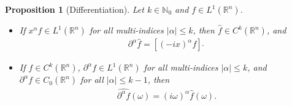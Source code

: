 \documentclass{article}
\numberwithin{equation}{section}
\newcommand{\bbR}{\mathbb{R}}
\newcommand{\wh}{\widehat}
\theoremstyle{plain}
\newtheorem{proposition}[theorem]{Proposition}
\theoremstyle{definition}
\begin{document}
\begin{proposition}[Differentiation]\label{fourierdiff}
Let $k\in\mathbb{N}_0$ and $f\in L^1(\bbR^n)$.
\begin{itemize}
\item[(i)] If $x^\alpha f\in L^1(\bbR^n)$ for all multi-indices $\vert\alpha\vert\leq k$, then $\wh{f}\in C^k(\bbR^n)$, and
\begin{align*}
	\partial^\alpha\wh{f}=[(-ix)^\alpha f]\,\wh{\ }
\end{align*}
\item[(ii)] If $f\in C^k(\bbR^n)$, $\partial^\alpha f\in L^1(\bbR^n)$ for all multi-indices $\vert\alpha\vert\leq k$, and $\partial^\alpha f\in C_0(\bbR^n)$ for all $\vert\alpha\vert\leq k-1$, then
\begin{align*}
	\wh{\partial^\alpha f}(\omega)=(i\omega)^\alpha\wh{f}(\omega).
\end{align*}
\end{itemize}
\end{proposition}
\end{document}
